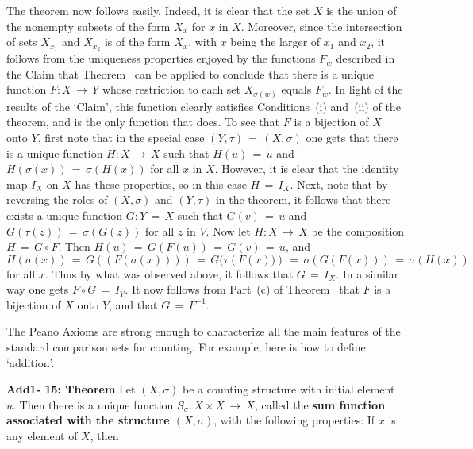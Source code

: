{        The theorem now follows easily.
    Indeed, it is clear that the set $X$ is the union of the nonempty subsets of the form $X_{x}$ for $x$ in $X$.
    Moreover, since the intersection of sets $X_{x_{1}}$ and $X_{x_{2}}$ is of the form $X_{x}$, with $x$ being the larger of $x_{1}$ and $x_{2}$,
    it follows from the uniqueness properties enjoyed by the functions $F_{w}$ described in the Claim that Theorem~ can be applied to conclude that there is a unique function $F:X \,{\rightarrow}\, Y$ whose restriction to each set $X_{{\sigma}(w)}$ equals $F_{w}$.
    In light of the results of the `Claim', this function clearly satisfies Conditions~(i) and~(ii) of the theorem, and is the only function that does.
    To see that $F$ is a bijection of $X$ onto $Y$, first note that in the special case $(Y,{\tau}) \,=\, (X,{\sigma})$ one gets that there is a unique function $H:X \,{\rightarrow}\, X$ such that $H(u) \,=\, u$ and $H({\sigma}(x)) \,=\, {\sigma}\left(H(x)\right)$ for all $x$ in $X$.
    However, it is clear that the identity map $I_{X}$ on $X$ has these properties, so in this case $H \,=\, I_{X}$.
    Next, note that by reversing the roles of $(X,{\sigma})$ and $(Y,{\tau})$ in the theorem,
    it follows that there exists a unique function $G:Y \,=\, X$ such that $G(v) \,=\, u$ and $G({\tau}(z)) \,=\, {\sigma}\left(G(z)\right)$ for all $z$ in $V$.
    Now let $H:X \,{\rightarrow}\, X$ be the composition $H \,=\, G{\circ}F$. Then $H(u) \,=\, G(F(u)) \,=\, G(v) \,=\, u$, and $H({\sigma}(x)) \,=\, G((F({\sigma}(x)))) \,=\, G({\tau}\left(F(x))\right) \,=\, {\sigma}(G(F(x))) \,=\, {\sigma}(H(x))$ for all $x$.
    Thus by what was observed above, it follows that $G \,=\, I_{X}$. In a similar way one gets $F{\circ}G \,=\, I_{Y}$.
    It now follows from Part~(c) of Theorem~ that $F$ is a bijection of $X$ onto $Y$, and that $G \,=\, F^{-1}$.

\V
\V

        The Peano Axioms are strong enough to characterize all the main features of the standard comparison sets for counting.
    For example, here is how to define `addition'.

\V

        {\bf Add1- 15: Theorem} Let $(X,{\sigma})$ be a counting structure with initial element~$u$.
    Then there is a unique function $S_{{\sigma}}:X{\times}X \,{\rightarrow}\, X$, called the {\bf sum function associated with the structure $(X,{\sigma})$},
    with the following properties: If $x$ is any element of $X$, then

}
